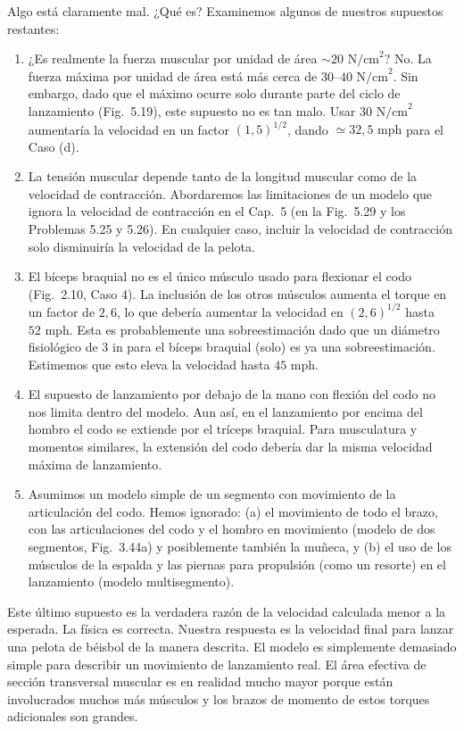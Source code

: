 \documentclass[12pt]{book}
\begin{document}
Algo está claramente mal. ¿Qué es? Examinemos algunos de nuestros supuestos restantes:
\begin{enumerate}
  \item ¿Es realmente la fuerza muscular por unidad de área $\sim 20\text{ N/cm}^2$? No. La fuerza máxima por unidad de área está más cerca de $30$--$40\text{ N/cm}^2$. Sin embargo, dado que el máximo ocurre solo durante parte del ciclo de lanzamiento (Fig.~5.19), este supuesto no es tan malo. Usar $30\text{ N/cm}^2$ aumentaría la velocidad en un factor $(1{,}5)^{1/2}$, dando $\simeq 32{,}5\text{ mph}$ para el Caso (d).
  \item La tensión muscular depende tanto de la longitud muscular como de la velocidad de contracción. Abordaremos las limitaciones de un modelo que ignora la velocidad de contracción en el Cap.~5 (en la Fig.~5.29 y los Problemas 5.25 y 5.26). En cualquier caso, incluir la velocidad de contracción solo disminuiría la velocidad de la pelota.
  \item El bíceps braquial no es el único músculo usado para flexionar el codo (Fig.~2.10, Caso 4). La inclusión de los otros músculos aumenta el torque en un factor de $2{,}6$, lo que debería aumentar la velocidad en $(2{,}6)^{1/2}$ hasta $52\text{ mph}$. Esta es probablemente una sobreestimación dado que un diámetro fisiológico de $3\text{ in}$ para el bíceps braquial (solo) es ya una sobreestimación. Estimemos que esto eleva la velocidad hasta $45\text{ mph}$.
  \item El supuesto de lanzamiento por debajo de la mano con flexión del codo no nos limita dentro del modelo. Aun así, en el lanzamiento por encima del hombro el codo se extiende por el tríceps braquial. Para musculatura y momentos similares, la extensión del codo debería dar la misma velocidad máxima de lanzamiento.
  \item Asumimos un modelo simple de un segmento con movimiento de la articulación del codo. Hemos ignorado: (a) el movimiento de todo el brazo, con las articulaciones del codo y el hombro en movimiento (modelo de dos segmentos, Fig.~3.44a) y posiblemente también la muñeca, y (b) el uso de los músculos de la espalda y las piernas para propulsión (como un resorte) en el lanzamiento (modelo multisegmento).
\end{enumerate}

Este último supuesto es la verdadera razón de la velocidad calculada menor a la esperada. La física es correcta. Nuestra respuesta es la velocidad final para lanzar una pelota de béisbol de la manera descrita. El modelo es simplemente demasiado simple para describir un movimiento de lanzamiento real. El área efectiva de sección transversal muscular es en realidad mucho mayor porque están involucrados muchos más músculos y los brazos de momento de estos torques adicionales son grandes.
\end{document}
